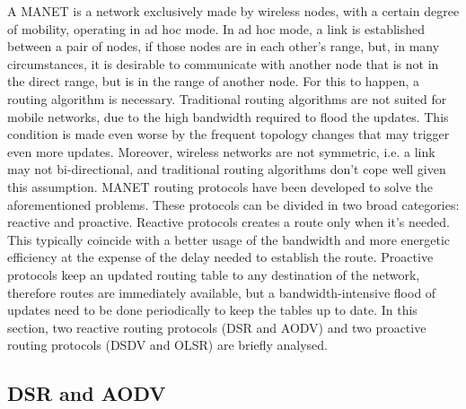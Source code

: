 A \gls{MANET} is a network exclusively made by wireless nodes, with a certain degree of mobility, operating in ad hoc mode. In ad hoc mode, a link is established between a pair of nodes, if those nodes are in each other's range, but, in many circumstances, it is desirable to communicate with another node that is not in the direct range, but is in the range of another node. For this to happen, a routing algorithm is necessary. Traditional routing algorithms are not suited for mobile networks, due to the high bandwidth required to flood the updates. This condition is made even worse by the frequent topology changes that may trigger even more updates. Moreover, wireless networks are not symmetric, i.e. a link may not bi-directional, and traditional routing algorithms don't cope well given this assumption. \gls{MANET} routing protocols have been developed to solve the aforementioned problems. These protocols can be divided in two broad categories: reactive and proactive. Reactive protocols creates a route only when it's needed. This typically coincide with a better usage of the bandwidth and more energetic efficiency at the expense of the delay needed to establish the route. Proactive protocols keep an updated routing table to any destination of the network, therefore routes are immediately available, but a bandwidth-intensive flood of updates need to be done periodically to keep the tables up to date. In this section, two reactive routing protocols (\gls{DSR} and \gls{AODV}) and two proactive routing protocols (\gls{DSDV} and \gls{OLSR}) are briefly analysed.

\subsection{DSR and AODV}

